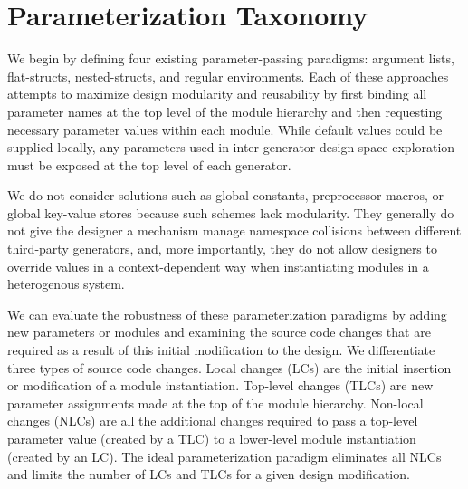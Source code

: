 \section{Parameterization Taxonomy}
\label{sec:tax}

We begin by defining four existing parameter-passing paradigms: argument lists, flat-structs, nested-structs, and regular environments.
Each of these approaches attempts to maximize design modularity and reusability by first binding all parameter names at the top level of the module hierarchy and then requesting necessary parameter values within each module. 
While default values could be supplied locally, any parameters used in inter-generator design space exploration must be exposed at the top level of each generator.

We do not consider solutions such as global constants, preprocessor macros, or global key-value stores because such schemes lack modularity.
They generally do not give the designer a mechanism manage namespace collisions between different third-party generators, 
and, more importantly, they do not allow designers to override values in a context-dependent way when instantiating modules in a heterogenous system.



We can evaluate the robustness of these parameterization paradigms by adding new parameters or modules and examining the source code changes that are required as a result of this initial modification to the design.
We differentiate three types of source code changes.
Local changes (LCs) are the initial insertion or modification of a module instantiation. 
Top-level changes (TLCs) are new parameter assignments made at the top  of the module hierarchy. 
Non-local changes (NLCs) are all the additional changes required to pass a top-level parameter value (created by a TLC) to a lower-level module instantiation (created by an LC). 
The ideal parameterization paradigm eliminates all NLCs and limits the number of LCs and TLCs for a given design modification.

